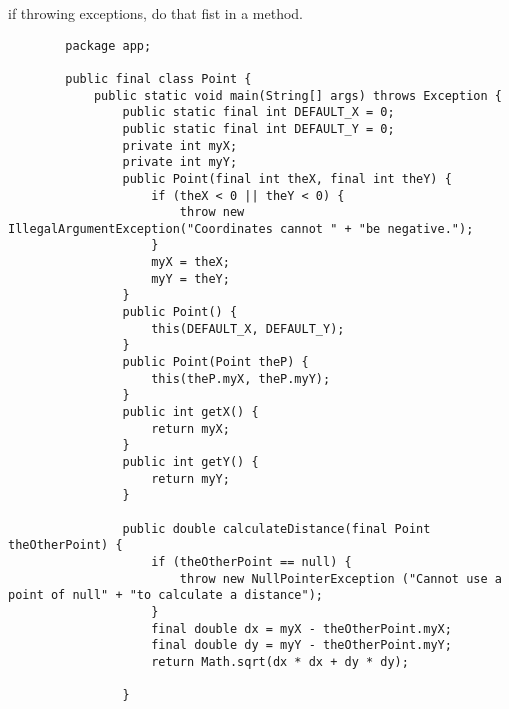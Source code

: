 \documentclass{article}
\begin{document}
    if throwing exceptions, do that fist in a method.



    \begin{lstlisting}
        package app;

        public final class Point {
            public static void main(String[] args) throws Exception {
                public static final int DEFAULT_X = 0;
                public static final int DEFAULT_Y = 0;
                private int myX;
                private int myY;
                public Point(final int theX, final int theY) {
                    if (theX < 0 || theY < 0) {
                        throw new IllegalArgumentException("Coordinates cannot " + "be negative.");
                    }
                    myX = theX;
                    myY = theY;
                }
                public Point() {
                    this(DEFAULT_X, DEFAULT_Y);
                }
                public Point(Point theP) {
                    this(theP.myX, theP.myY);
                }
                public int getX() {
                    return myX;
                }
                public int getY() {
                    return myY;
                }
            
                public double calculateDistance(final Point theOtherPoint) {
                    if (theOtherPoint == null) {
                        throw new NullPointerException ("Cannot use a point of null" + "to calculate a distance");
                    }
                    final double dx = myX - theOtherPoint.myX;
                    final double dy = myY - theOtherPoint.myY;
                    return Math.sqrt(dx * dx + dy * dy);
            
                }
        

\end{lstlisting}
\end{document}
